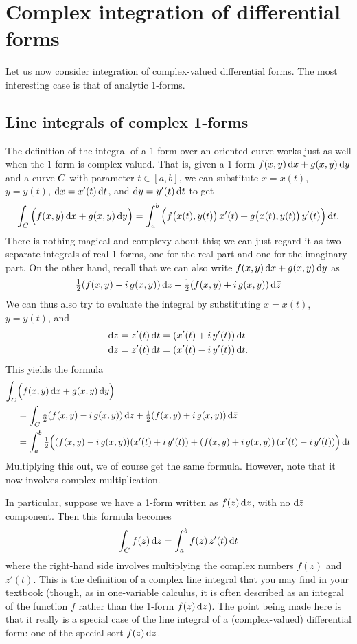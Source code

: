 \ifdefined\inmaster\else\def\subonly{\jobname}\fi

\chapter{Complex integration of differential forms}

Let us now consider integration of complex-valued differential forms.
The most interesting case is that of analytic 1-forms.

\section{Line integrals of complex 1-forms}
\label{sec:complex-line-integrals}

The definition of the integral of a 1-form over an oriented curve works just as well when the 1-form is complex-valued.
That is, given a 1-form $f(x,y)\,\dx + g(x,y)\,\dy$ and a curve $\curve$ with parameter $t\in [a,b]$, we can substitute $x = x(t)$, $y=y(t)$, $\dx = x'(t)\,\dt$, and $\dy = y'(t)\,\dt$ to get
\[ \lint{\curve} \Big(f(x,y)\,\dx + g(x,y)\,\dy\Big) = \itint t a b {\Big( f\big(x(t),y(t)\big)\, x'(t) + g\big(x(t),y(t)\big)\,y'(t)\Big)}. \]
There is nothing magical and complexy about this; we can just regard it as two separate integrals of real 1-forms, one for the real part and one for the imaginary part.
On the other hand, recall that we can also write $f(x,y)\,\dx + g(x,y)\,\dy$ as
\[\half (f(x,y) -i\, g(x,y))\,\dz + \half (f(x,y) +i\, g(x,y))\,\dzbar \]
We can thus also try to evaluate the integral by substituting $x = x(t)$, $y=y(t)$, and
\begin{align*}
  \dz &= z'(t) \,\dt = (x'(t) + i\,y'(t))\,\dt\\
  \dzbar &= \zbar'(t) \,\dt = (x'(t) - i\,y'(t))\,\dt.
\end{align*}
This yields the formula
\begin{align*}
  \lint{\curve} &\Big(f(x,y)\,\dx + g(x,y)\,\dy\Big)\\
  &= \lint{\curve} \half (f(x,y) -i\, g(x,y))\,\dz + \half (f(x,y) +i\, g(x,y))\,\dzbar\\
  &= \itint t a b {\half \Big((f(x,y) -i\, g(x,y)) (x'(t) + i\,y'(t)) + (f(x,y) +i\, g(x,y))\,(x'(t) - i\,y'(t))\Big)}
\end{align*}
Multiplying this out, we of course get the same formula.
However, note that it now involves complex multiplication.

In particular, suppose we have a 1-form written as $f(z) \,\dz$, with no $\dzbar$ component.
Then this formula becomes
\[ \lint{\curve} f(z) \,\dz = \itint t a b {f(z)\, z'(t)}\]
where the right-hand side involves multiplying the complex numbers $f(z)$ and $z'(t)$.
This is the definition of a complex line integral that you may find in your textbook (though, as in one-variable calculus, it is often described as an integral of the function $f$ rather than the 1-form $f(z)\,\dz$).
The point being made here is that it really is a special case of the line integral of a (complex-valued) differential form: one of the special sort $f(z)\,\dz$.

